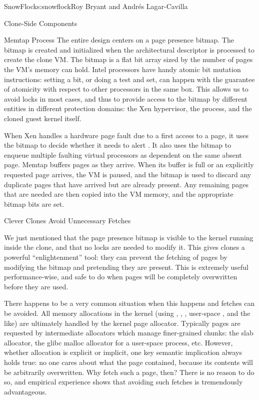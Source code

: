 \begin{aosachapter}{SnowFlock}{s:snowflock}{Roy Bryant and Andr\'e{s} Lagar-Cavilla}
\begin{aosasect1}{Clone-Side Components}
\begin{aosasect2}{Memtap Process}
The entire  design centers on a page presence bitmap. The bitmap
is created and initialized when the architectural descriptor is
processed to create the clone VM\@.
The bitmap is a flat bit array sized by the number of pages the VM's memory can hold. 
Intel processors have handy atomic
bit mutation instructions: setting a bit, or doing a test and set, can
happen with the guarantee of atomicity with respect to other
processors in the same box.  This allows us to avoid
locks in most cases, and thus to provide access to the bitmap by
different entities in different protection domains: the Xen
hypervisor, the  process, and the cloned guest kernel itself.

When Xen handles a hardware page fault due to a first access to a
page, it uses the bitmap to decide whether it needs to alert
. It also uses the bitmap to enqueue multiple faulting virtual
processors as dependent on the same absent page. Memtap buffers pages
as they arrive.  When its buffer is full or an explicitly requested
page arrives, the VM is paused, and the bitmap is used to discard any
duplicate pages that have arrived but are already present. Any
remaining pages that are needed are then copied into the VM memory,
and the appropriate bitmap bits are set.

\end{aosasect2}

\begin{aosasect2}{Clever Clones Avoid Unnecessary Fetches}

We just mentioned that the page presence bitmap is visible to the
kernel running inside the clone, and that no locks are needed to
modify it. This gives clones a powerful ``enlightenment'' tool: they can prevent the
fetching of pages by modifying the bitmap and pretending they are
present. This is extremely useful performance-wise, and safe to do
when pages will be completely overwritten before they are used.

There happens to be a very common situation when this happens and
fetches can be avoided. All memory allocations in the kernel (using
, , ,
user-space , and the like) are ultimately
handled by the kernel page allocator. Typically pages are requested by
intermediate allocators which manage finer-grained chunks: the slab
allocator, the glibc malloc allocator for a user-space process,
etc. However, whether allocation is explicit or implicit,
one key semantic implication
always holds true: no one cares about what the page contained,
because its contents will be arbitrarily overwritten. Why
fetch such a page, then? There is no reason to do so, and empirical
experience shows that avoiding such fetches is tremendously
advantageous.


\end{aosasect2}
\end{aosasect1}
\end{aosachapter}
